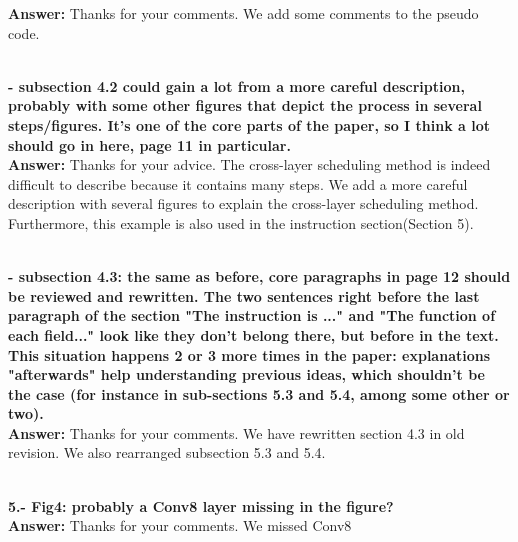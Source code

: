 \documentclass[12pt]{paper}
\newcommand{\rev}[1]{{{\color[rgb]{0,0,1}{#1}}}}
\newcommand{\answer}[1]{\noindent\textbf{Answer:} #1}
\newcommand{\comment}[1]{\noindent\textbf{\\ #1}\\}
\begin{document}
\answer{Thanks for your comments. We add some comments to the pseudo code. \\
}
\rev{We add comments in the Algorithm 3 to make the pseudo code easier to understand. In fact, the +2 in rows is resulted from Winograd transformation. Similarity at line 7, the +2 in col is also resulted from Winograd, and we add comment for line 7.}


\comment{- subsection 4.2 could gain a lot from a more careful description, probably with some other figures that depict the process in several steps/figures. It's one of the core parts of the paper, so I think a lot should go in here, page 11 in particular.}

\answer{Thanks for your advice. The cross-layer scheduling method is indeed difficult to describe because it contains many steps. We add a more careful description with several figures to explain the cross-layer scheduling method. \\
}
\rev{We have redrawn fig 5 to illustrate each step of a example CNN with only two layers. We also have changed the paragraphs describing this example.}
Furthermore, this example is also used in the instruction section(Section 5).

\comment{- subsection 4.3: the same as before, core paragraphs in page 12 should be reviewed and rewritten. The two sentences right before the last paragraph of the section "The instruction is ..." and "The function of each field..." look like they don't belong there, but before in the text. This situation happens 2 or 3 more times in the paper: explanations "afterwards" help understanding previous ideas, which shouldn't be the case (for instance in sub-sections 5.3 and 5.4, among some other or two). 
}
\answer{Thanks for your comments. We have rewritten section 4.3  in old revision. We also rearranged subsection 5.3 and 5.4.\\}
\rev{We have moved subsection 4.3 to a new section(Section 6), and have rewritten all the section with more detials and two code examples for the examples in fig 5. We have merged subsection 5.3, 5.4 and 5.5 to discribe the key idea of our data buffer design.}

\comment{5.- Fig4: probably a Conv8 layer missing in the figure? }
\answer{Thanks for your comments. We missed Conv8}
\rev{We have rewritten this figure and fixed this error.}
\end{document}
